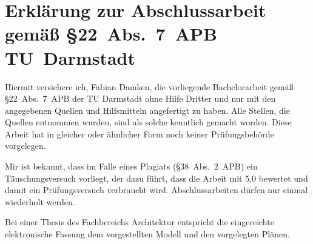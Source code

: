 

\section*{Erklärung zur Abschlussarbeit gemäß \S{}22~Abs.~7~APB TU~Darmstadt}
	Hiermit versichere ich, Fabian Damken, die vorliegende Bachelorarbeit gemäß \S{}22~Abs.~7~APB der TU Darmstadt ohne Hilfe Dritter und nur mit den angegebenen Quellen und Hilfsmitteln angefertigt zu haben. Alle Stellen, die Quellen entnommen wurden, sind als solche kenntlich gemacht worden. Diese Arbeit hat in gleicher oder ähnlicher Form noch keiner Prüfungsbehörde vorgelegen.

	Mir ist bekannt, dass im Falle eines Plagiats (\S{}38~Abs.~2~APB) ein Täuschungsversuch vorliegt, der dazu führt, dass die Arbeit mit 5,0 bewertet und damit ein Prüfungsversuch verbraucht wird. Abschlussarbeiten dürfen nur einmal wiederholt werden.

	Bei einer Thesis des Fachbereichs Architektur entspricht die eingereichte elektronische Fassung dem vorge\-stellten Modell und den vorgelegten Plänen.

	\AffidavitSignature[Darmstadt]
